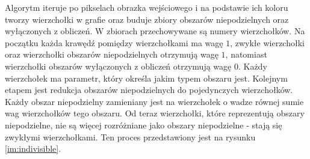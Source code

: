 Algorytm iteruje po pikselach obrazka wejściowego i na podstawie ich koloru tworzy wierzchołki w grafie oraz buduje zbiory
obszarów niepodzielnych oraz wyłączonych z obliczeń.
W zbiorach przechowywane są numery wierzchołków.
Na początku każda krawędź pomiędzy wierzchołkami ma wagę $1$,
zwykłe wierzchołki oraz wierzchołki obszarów niepodzielnych otrzymują wagę $1$,
natomiast wierzchołki obszarów wyłączonych z obliczeń otrzymują wagę $0$.
Każdy wierzchołek ma parametr, który określa jakim typem obszaru jest.
Kolejnym etapem jest redukcja obszarów niepodzielnych do pojedynczych wierzchołków.
Każdy obszar niepodzielny zamieniany jest na wierzchołek o wadze równej sumie wag wierzchołków tego obszaru.
Od teraz wierzchołki, które reprezentują obszary niepodzielne, nie są więcej rozróżniane jako obszary niepodzielne -
stają się zwykłymi
wierzchołkami.
Ten proces przedstawiony jest na rysunku \ref{im:indivisible}.

